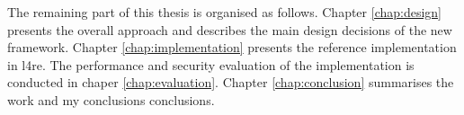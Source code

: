 The remaining part of this thesis is organised as follows.
Chapter \ref{chap:design} presents the overall approach and describes the main design decisions of the new framework.
Chapter \ref{chap:implementation} presents the reference implementation in \ac{l4re}.
The performance and security evaluation of the implementation is conducted in chaper \ref{chap:evaluation}.
Chapter \ref{chap:conclusion} summarises the work and my conclusions conclusions.
